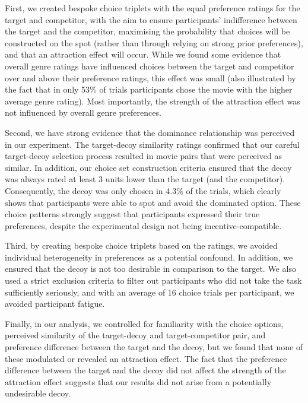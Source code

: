 \documentclass[12pt, a4paper]{article}
\begin{document}
First, we created bespoke choice triplets with the equal preference ratings for the target and competitor, with the aim to ensure participants' indifference between the target and the competitor, maximising the probability that choices will be constructed on the spot (rather than through relying on strong prior preferences), and that an attraction effect will occur. While we found some evidence that overall genre ratings have influenced choices between the target and competitor over and above their preference ratings, this effect was small (also illustrated by the fact that in only 53\% of trials participants chose the movie with the higher average genre rating). Most importantly, the strength of the attraction effect was not influenced by overall genre preferences. 

Second, we have strong evidence that the dominance relationship was perceived in our experiment. The target-decoy similarity ratings confirmed that our careful target-decoy selection process resulted in movie pairs that were perceived as similar. In addition, our choice set construction criteria ensured that the decoy was always rated at least 3 units lower than the target (and the competitor). Consequently, the decoy was only chosen in 4.3\% of the trials, which clearly shows that participants were able to spot and avoid the dominated option. These choice patterns strongly suggest that participants expressed their true preferences, despite the experimental design not being incentive-compatible.

Third, by creating bespoke choice triplets based on the ratings, we avoided individual heterogeneity in preferences as a potential confound. In addition, we ensured that the decoy is not too desirable in comparison to the target. We also used a strict exclusion criteria to filter out participants who did not take the task sufficiently seriously, and with an average of 16 choice trials per participant, we avoided participant fatigue.

Finally, in our analysis, we controlled for familiarity with the choice options, perceived similarity of the target-decoy and target-competitor pair, and preference difference between the target and the decoy, but we found that none of these modulated or revealed an attraction effect. The fact that the preference difference between the target and the decoy did not affect the strength of the attraction effect suggests that our results did not arise from a potentially undesirable decoy. 
\end{document}
